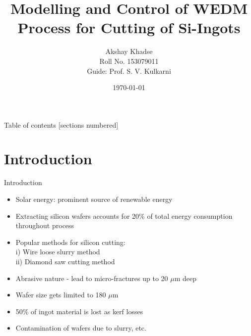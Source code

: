 \documentclass[10pt]{beamer}
\begin{document}
\title{Modelling and Control of WEDM Process for Cutting of Si-Ingots}
\author{Akshay Khadse \\ Roll No. 153079011 \\ Guide: Prof. S. V. Kulkarni}
\date{\today}
\maketitle

\begin{frame}{Table of contents}
  [sections numbered]
  \tableofcontents[hideallsubsections]
\end{frame}

\section{Introduction}
\begin{frame}{Introduction}
  \begin{itemize}
    \item Solar energy: \alert{prominent source} of renewable energy
    \item Extracting silicon wafers accounts for \alert{20\%} of total energy consumption throughout process \cite{del09}
    \item Popular methods for silicon cutting: \\ i) Wire loose slurry method \\ ii) Diamond saw cutting method
    \item Abrasive nature - lead to \alert{micro-fractures} up to 20 $\mu$m deep
    \item Wafer size gets limited to \alert{180 $\mu$m} \cite{sopori13}
    \item 50\% of ingot material is lost as \alert{kerf losses} \cite{joshi10}
    \item \alert{Contamination} of wafers due to slurry, etc. \cite{moeller2015}
  \end{itemize}
\end{frame}
\end{document}
